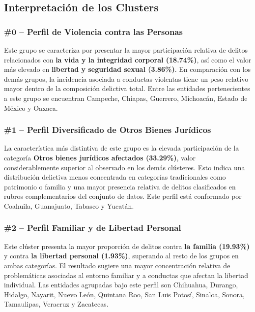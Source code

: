 \subsection{Interpretación de los Clusters}

\subsubsection{\#0 – Perfil de Violencia contra las Personas}

Este grupo se caracteriza por presentar la mayor participación relativa de delitos relacionados con \textbf{la vida y la
integridad corporal (18.74\%)}, así como el valor más elevado en \textbf{libertad y seguridad sexual (3.86\%)}. En comparación
con los demás grupos, la incidencia asociada a conductas violentas tiene un peso relativo mayor dentro de la composición
delictiva total. Entre las entidades pertenecientes a este grupo se encuentran Campeche, Chiapas, Guerrero, Michoacán,
Estado de México y Oaxaca.

\subsubsection{\#1 – Perfil Diversificado de Otros Bienes Jurídicos}

La característica más distintiva de este grupo es la elevada participación de la categoría \textbf{Otros bienes jurídicos
afectados (33.29\%)}, valor considerablemente superior al observado en los demás clústeres. Esto indica una distribución
delictiva menos concentrada en categorías tradicionales como patrimonio o familia y una mayor presencia relativa de
delitos clasificados en rubros complementarios del conjunto de datos. Este perfil está conformado por Coahuila,
Guanajuato, Tabasco y Yucatán.

\subsubsection{\#2 – Perfil Familiar y de Libertad Personal}

Este clúster presenta la mayor proporción de delitos contra \textbf{la familia (19.93\%)} y contra \textbf{la libertad personal
(1.93\%)}, superando al resto de los grupos en ambas categorías. El resultado sugiere una mayor concentración relativa
de problemáticas asociadas al entorno familiar y a conductas que afectan la libertad individual. Las entidades agrupadas
bajo este perfil son Chihuahua, Durango, Hidalgo, Nayarit, Nuevo León, Quintana Roo, San Luis Potosí, Sinaloa, Sonora,
Tamaulipas, Veracruz y Zacatecas.

